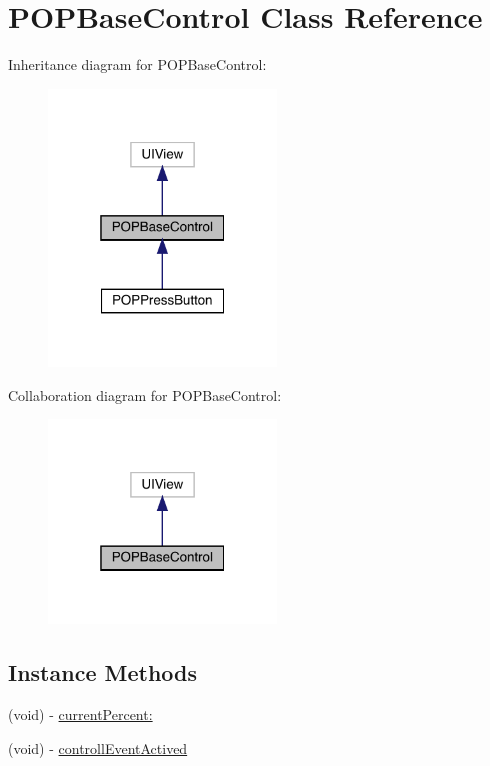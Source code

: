 \hypertarget{interface_p_o_p_base_control}{}\section{P\+O\+P\+Base\+Control Class Reference}
\label{interface_p_o_p_base_control}


Inheritance diagram for P\+O\+P\+Base\+Control\+:\nopagebreak
\begin{figure}[H]
\begin{center}
\leavevmode
\includegraphics[width=172pt]{interface_p_o_p_base_control__inherit__graph}
\end{center}
\end{figure}


Collaboration diagram for P\+O\+P\+Base\+Control\+:\nopagebreak
\begin{figure}[H]
\begin{center}
\leavevmode
\includegraphics[width=172pt]{interface_p_o_p_base_control__coll__graph}
\end{center}
\end{figure}
\subsection*{Instance Methods}
\begin{DoxyCompactItemize}
\item 
(void) -\/ \mbox{\hyperlink{interface_p_o_p_base_control_a8e8d12b9f61d08e2d1441480cd4e450e}{current\+Percent\+:}}
\item 
(void) -\/ \mbox{\hyperlink{interface_p_o_p_base_control_a96e39b203098160b78db82035ae4208f}{controll\+Event\+Actived}}
\end{DoxyCompactItemize}
